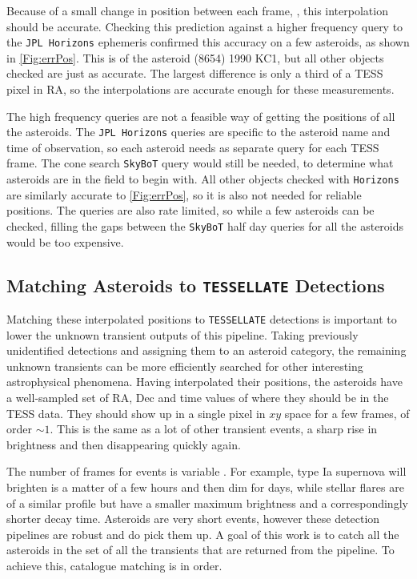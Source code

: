 \documentclass{UCreport}
\begin{document}
Because of a small change in position between each frame, \citep[$\sim \qty{1}{\px}$ per \qty{30}{min} FFI][]{Pal2018}, this interpolation should be accurate.
Checking this prediction against a higher frequency query to the \texttt{JPL Horizons} ephemeris confirmed this accuracy on a few asteroids, as shown in \autoref{Fig:errPos}.
This is of the asteroid (8654) 1990 KC1, but all other objects checked are just as accurate.
The largest difference is only a third of a TESS pixel in RA, so the interpolations are accurate enough for these measurements.

The high frequency queries are not a feasible way of getting the positions of all the asteroids.
The \texttt{JPL Horizons} queries are specific to the asteroid name and time of observation, so each asteroid needs as separate query for each TESS frame.
The cone search \texttt{SkyBoT} query would still be needed, to determine what asteroids are in the field to begin with.
All other objects checked with \texttt{Horizons} are similarly accurate to \autoref{Fig:errPos}, so it is also not needed for reliable positions.
The queries are also rate limited, so while a few asteroids can be checked, filling the gaps between the \texttt{SkyBoT} half day queries for all the asteroids would be too expensive.


\subsection{Matching Asteroids to \texttt{TESSELLATE} Detections}\label{SubSec:Match}

Matching these interpolated positions to \texttt{TESSELLATE} detections is important to lower the unknown transient outputs of this pipeline.
Taking previously unidentified detections and assigning them to an asteroid category, the remaining unknown transients can be more efficiently searched for other interesting astrophysical phenomena.
Having interpolated their positions, the asteroids have a well-sampled set of RA, Dec and time values of where they should be in the TESS data.
They should show up in a single pixel in $xy$ space for a few frames, of order $\sim1$.
This is the same as a lot of other transient events, a sharp rise in brightness and then disappearing quickly again.

The number of frames for events is variable \citep{TESSELLATE}.
For example, type Ia supernova will brighten is a matter of a few hours and then dim for days, while stellar flares are of a similar profile but have a smaller maximum brightness and a correspondingly shorter decay time.
Asteroids are very short events, however these detection pipelines are robust and do pick them up.
A goal of this work is to catch all the asteroids in the set of all the transients that are returned from the pipeline.
To achieve this, catalogue matching is in order.
\end{document}
